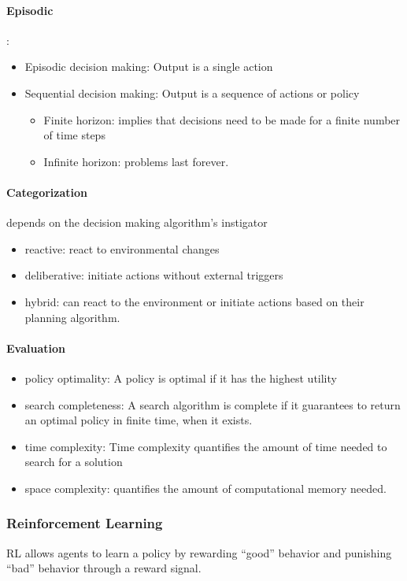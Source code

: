 \documentclass{article}
\begin{document}
	 	\paragraph{Episodic}:
	 	\begin{itemize}
	 		\item Episodic decision making: Output is a single action
	 		\item Sequential decision making: Output is a sequence of actions or policy
	 			\begin{itemize}
	 				\item Finite horizon: implies that decisions need to be made for a finite number of time steps
	 				\item Infinite horizon: problems last forever.
	 			\end{itemize}	
	 	\end{itemize}
	 
 		\paragraph{Categorization} depends on the decision making algorithm’s instigator
	 		\begin{itemize}
	 			\item reactive: react to environmental changes
	 			\item deliberative: initiate actions without external triggers
	 			\item hybrid:  can react to the environment or initiate actions based on their planning algorithm.
 			\end{itemize}
 		
 		\paragraph{Evaluation} \citet{rizk-2018-decision-making-in-multiagent-systems-a-survey}
 			\begin{itemize}
 				\item policy optimality: A policy is optimal if it has the highest utility
 				\item search completeness: A search algorithm is complete if it guarantees to return an optimal policy
 				in finite time, when it exists.
 				\item time complexity: Time complexity quantifies the amount of time needed to search for a solution 
 				\item space complexity: quantifies the amount of computational memory
 				needed.
 			\end{itemize}
 		\subsubsection{Reinforcement Learning} RL allows agents to learn a policy by rewarding “good” behavior and punishing “bad” behavior through a reward signal.

	
\end{document}
